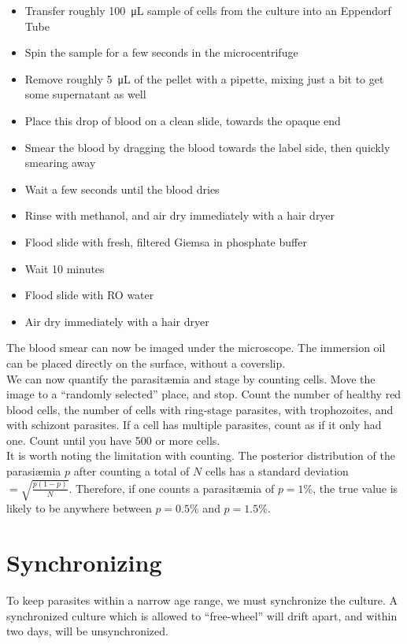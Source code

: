 \documentclass{article}
\begin{document}
\begin{itemize}
	\item Transfer roughly \SI{100}{\micro L} sample of cells from the culture into an Eppendorf Tube
	\item Spin the sample for a few seconds in the microcentrifuge
	\item Remove roughly \SI{5}{\micro L} of the pellet with a pipette, mixing just a bit to get some supernatant as well
	\item Place this drop of blood on a clean slide, towards the opaque end
	\item Smear the blood by dragging the blood towards the label side, then quickly smearing away 
	\item Wait a few seconds until the blood dries
	\item Rinse with methanol, and air dry immediately with a hair dryer
	\item Flood slide with fresh, filtered Giemsa in phosphate buffer
	\item Wait 10 minutes
	\item Flood slide with RO water
	\item Air dry immediately with a hair dryer
\end{itemize}

The blood smear can now be imaged under the microscope. The immersion oil can be placed directly on the surface, without a coverslip.\\

We can now quantify the parasit{\ae}mia and stage by counting cells. Move the image to a ``randomly selected'' place, and stop. Count the number of healthy red blood cells, the number of cells with ring-stage parasites, with trophozoites, and with schizont parasites. If a cell has multiple parasites, count as if it only had one. Count until you have 500 or more cells.\\

It is worth noting the limitation with counting. The posterior distribution of the parasi{\ae}mia $p$ after counting a total of $N$ cells has a standard deviation $ = \sqrt{\frac{p(1-p)}{N}}$. Therefore, if one counts a parasit{\ae}mia of $p = 1\%$, the true value is likely to be anywhere between $p = 0.5\%$ and $p = 1.5\%$.

\section{Synchronizing}

To keep parasites within a narrow age range, we must synchronize the culture. A synchronized culture which is allowed to ``free-wheel'' will drift apart, and within two days, will be unsynchronized.\\
\end{document}
